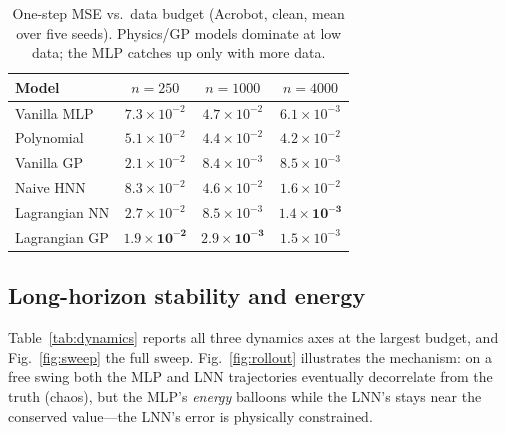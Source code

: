 \documentclass[conference]{IEEEtran}
\begin{document}
\begin{table}[t]
\caption{One-step MSE vs.\ data budget (Acrobot, clean, mean over five seeds).
Physics/GP models dominate at low data; the MLP catches up only with more data.}
\label{tab:budget}
\centering
\begin{tabular}{lccc}
\toprule
Model & $n{=}250$ & $n{=}1000$ & $n{=}4000$ \\
\midrule
Vanilla MLP    & $7.3\times10^{-2}$ & $4.7\times10^{-2}$ & $6.1\times10^{-3}$ \\
Polynomial     & $5.1\times10^{-2}$ & $4.4\times10^{-2}$ & $4.2\times10^{-2}$ \\
Vanilla GP     & $2.1\times10^{-2}$ & $8.4\times10^{-3}$ & $8.5\times10^{-3}$ \\
Naive HNN      & $8.3\times10^{-2}$ & $4.6\times10^{-2}$ & $1.6\times10^{-2}$ \\
Lagrangian NN  & $2.7\times10^{-2}$ & $8.5\times10^{-3}$ & $\mathbf{1.4\times10^{-3}}$ \\
Lagrangian GP  & $\mathbf{1.9\times10^{-2}}$ & $\mathbf{2.9\times10^{-3}}$ & $1.5\times10^{-3}$ \\
\bottomrule
\end{tabular}
\end{table}

\subsection{Long-horizon stability and energy}
Table~\ref{tab:dynamics} reports all three dynamics axes at the largest budget,
and Fig.~\ref{fig:sweep} the full sweep. Fig.~\ref{fig:rollout} illustrates the
mechanism: on a free swing both the MLP and LNN trajectories eventually decorrelate
from the truth (chaos), but the MLP's \emph{energy} balloons while the LNN's stays
near the conserved value---the LNN's error is physically constrained.
\end{document}

